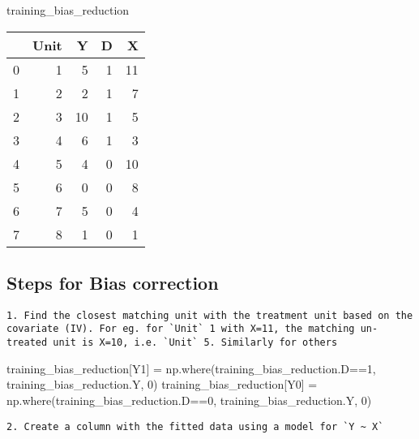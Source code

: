 \documentclass[
  letterpaper,
  DIV=11,
  numbers=noendperiod]{scrartcl}
\newenvironment{Shaded}{\begin{snugshade}}{\end{snugshade}}
\newcommand{\DecValTok}[1]{\textcolor[rgb]{0.68,0.00,0.00}{#1}}
\newcommand{\NormalTok}[1]{\textcolor[rgb]{0.00,0.23,0.31}{#1}}
\newcommand{\OperatorTok}[1]{\textcolor[rgb]{0.37,0.37,0.37}{#1}}
\newcommand{\StringTok}[1]{\textcolor[rgb]{0.13,0.47,0.30}{#1}}
\begin{document}
\begin{Shaded}
\begin{Highlighting}[]
\NormalTok{training\_bias\_reduction}
\end{Highlighting}
\end{Shaded}

\begin{tabular}{lrrrr}
\toprule
{} &  Unit &   Y &  D &   X \\
\midrule
0 &     1 &   5 &  1 &  11 \\
1 &     2 &   2 &  1 &   7 \\
2 &     3 &  10 &  1 &   5 \\
3 &     4 &   6 &  1 &   3 \\
4 &     5 &   4 &  0 &  10 \\
5 &     6 &   0 &  0 &   8 \\
6 &     7 &   5 &  0 &   4 \\
7 &     8 &   1 &  0 &   1 \\
\bottomrule
\end{tabular}

\hypertarget{steps-for-bias-correction}{%
\subsection{Steps for Bias correction}\label{steps-for-bias-correction}}

\begin{verbatim}
1. Find the closest matching unit with the treatment unit based on the covariate (IV). For eg. for `Unit` 1 with X=11, the matching un-treated unit is X=10, i.e. `Unit` 5. Similarly for others
\end{verbatim}

\begin{Shaded}
\begin{Highlighting}[]
\NormalTok{training\_bias\_reduction[}\StringTok{\textquotesingle{}Y1\textquotesingle{}}\NormalTok{] }\OperatorTok{=}\NormalTok{ np.where(training\_bias\_reduction.D}\OperatorTok{==}\DecValTok{1}\NormalTok{, training\_bias\_reduction.Y, }\DecValTok{0}\NormalTok{)}
\NormalTok{training\_bias\_reduction[}\StringTok{\textquotesingle{}Y0\textquotesingle{}}\NormalTok{] }\OperatorTok{=}\NormalTok{ np.where(training\_bias\_reduction.D}\OperatorTok{==}\DecValTok{0}\NormalTok{, training\_bias\_reduction.Y, }\DecValTok{0}\NormalTok{)}
\end{Highlighting}
\end{Shaded}

\begin{verbatim}
2. Create a column with the fitted data using a model for `Y ~ X`
\end{verbatim}
\end{document}

